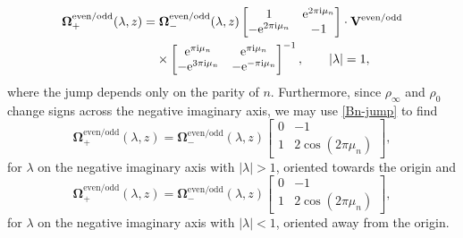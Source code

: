 \documentclass[pdftex]{sigma}
\numberwithin{equation}{section}
\newcommand{\ee}{\mathrm{e}}
\newcommand{\ii}{\mathrm{i}}
\begin{document}
\begin{align}
 &\mathbf{\Omega}^\mathrm{even/odd}_+(\lambda, z) = \mathbf{\Omega}_-^\mathrm{even/odd}(\lambda, z) \begin{bmatrix} 1 & \ee^{2\pi \ii \mu_n} \\ -\ee^{2\pi \ii \mu_n} & -1 \end{bmatrix} \cdot \mathbf{V}^\mathrm{even/odd} \nonumber\\
 &\hphantom{\mathbf{\Omega}^\mathrm{even/odd}_+(\lambda, z) =}{}
 \times\begin{bmatrix} \ee^{\pi \ii \mu_n}& \ee^{\pi \ii \mu_n}\\ - \ee^{3\pi \ii \mu_n} & - \ee^{-\pi \ii \mu_n} \end{bmatrix}^{-1}, \qquad |\lambda| = 1,
 \label{eq:Omega-jump-circle}
\end{align}
where the jump depends only on the parity of $n$. Furthermore, since $\rho_\infty$ and $\rho_0$ change signs across the negative imaginary axis, we may use \eqref{Bn-jump} to find
\begin{equation}
 \mathbf{\Omega}_+^\mathrm{even/odd} (\lambda, z) = \mathbf{\Omega}_-^\mathrm{even/odd} (\lambda, z) \begin{bmatrix}
0 & -1 \\ 1 & 2\cos(2\pi \mu_n)
\end{bmatrix},
\end{equation}
for $\lambda$ on the negative imaginary axis with $|\lambda| > 1$, oriented towards the origin and
\begin{equation}
 \mathbf{\Omega}_+^\mathrm{even/odd} (\lambda, z) = \mathbf{\Omega}_-^\mathrm{even/odd} (\lambda, z) \begin{bmatrix}
0 & -1 \\ 1 & 2\cos(2\pi \mu_n)
\end{bmatrix},
\label{eq:Omega-jump-outside-circle}
\end{equation}
for $\lambda$ on the negative imaginary axis with $|\lambda| <1$, oriented away from the origin.
\end{document}

